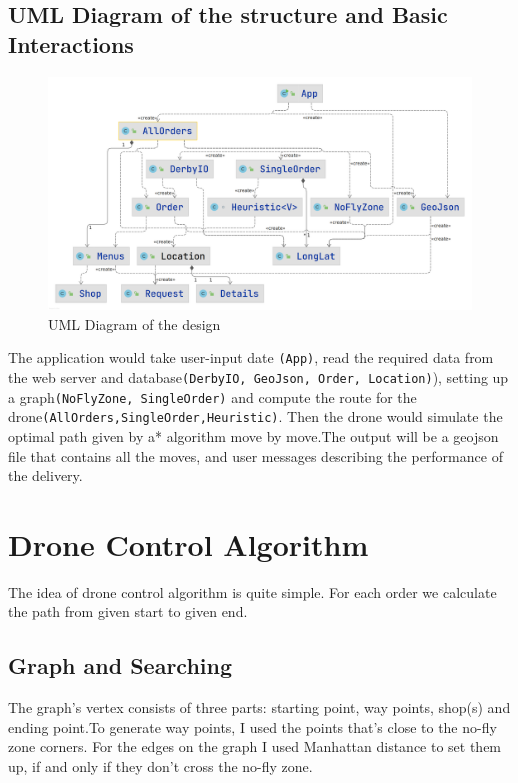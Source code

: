 \documentclass[a4paper,article,fontsize=15pt]{scrartcl}
\numberwithin{equation}{section}		%
\numberwithin{figure}{section}			%
\numberwithin{table}{section}				%
\begin{document}
    \newpage
    
    \subsection{UML Diagram of the structure and Basic Interactions} 
    \begin{figure}[H]
        \centering
    	    \includegraphics[width=1\textwidth, height=0.45\textheight]{main.png}
    	\caption{UML Diagram of the design}
        \label{UML}
    \end{figure}
The application would take user-input date \texttt{(App)}, read the required data from the web server and database\texttt{(DerbyIO, GeoJson, Order, Location)}), setting up a graph\texttt{(NoFlyZone, SingleOrder)} and compute the route for the drone\texttt{(AllOrders,SingleOrder,Heuristic)}. Then the drone would simulate the optimal path given by a* algorithm move by move.The output will be a geojson file that contains all the moves, and user messages describing the performance of the delivery.

\newpage
\section{Drone Control Algorithm}

The idea of drone control algorithm is quite simple. For each order we calculate the path from
given start to given end.


\subsection{Graph and Searching}
The graph's vertex consists of three parts:  starting point, way points, shop(s) and ending point.To generate way points, I used the points that's close to the no-fly zone corners. For the edges on the graph I used Manhattan distance to set them up, if and only if they don't cross the no-fly zone.
\end{document}
